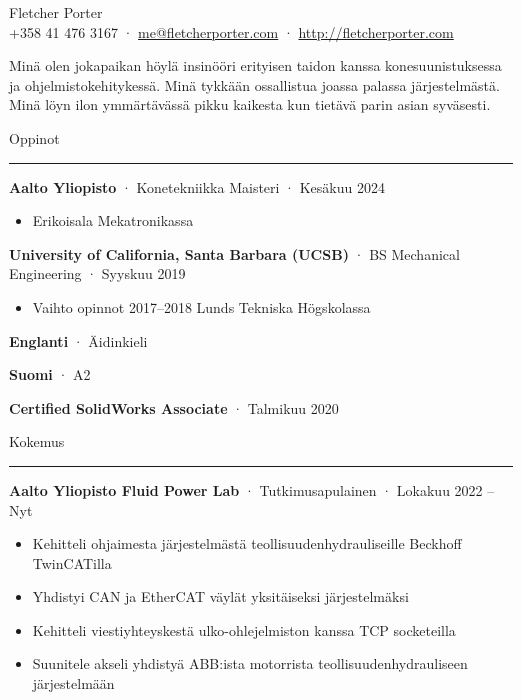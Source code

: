 \documentclass[12pt, oneside]{article}
\newcommand{\titlestyle}[1] {
	{\fontsize{40pt}{1em}\selectfont \textcolor{new_red}{\textsf{#1}}} \\
}
\newcommand{\headingstyleJobs}[1] {
	{\fontsize{18pt}{1em}\selectfont \textcolor{new_red}{\textsf{#1}}}
	\textcolor{new_red}{\rule{3.25in}{0.5pt}} \vspace{3pt}
}
\newcommand{\infostyle}[1] {
	{\selectfont #1} \\ %
}
\newcommand{\jobtitle}[3] {
	{\bf #1} · {#2} · {#3} \vspace{-7pt} \\
}
\newcommand{\certification}[2] {
	{\bf #1} · {#2}
}
\renewenvironment{quote}{%
  \list{}{%
    \leftmargin4pt
    \rightmargin\leftmargin
  }
  \item\relax
}
{\endlist}
\newcommand{\overview}[1] {
	\begin{quote}
		#1
	\end{quote}
}
\begin{document}
\begin{flushleft}



\titlestyle{Fletcher Porter}
\infostyle{+358 41 476 3167 · \href{mailto:me@fletcherporter.com}{me@fletcherporter.com} · \url{http://fletcherporter.com}}

\overview{
Minä olen jokapaikan höylä insinööri erityisen taidon kanssa konesuunistuksessa ja ohjelmistokehitykessä.  Minä tykkään ossallistua joassa palassa järjestelmästä.  Minä löyn ilon ymmärtävässä pikku kaikesta kun tietävä parin asian syväsesti.
}

\headingstyleJobs{Oppinot}

\jobtitle{Aalto Yliopisto}{Konetekniikka Maisteri}{Kesäkuu 2024}
\begin{itemize}
    \item Erikoisala Mekatronikassa
\end{itemize}

\jobtitle{University of California, Santa Barbara (UCSB)}{BS Mechanical Engineering}{Syyskuu 2019}
\begin{itemize}
	\item Vaihto opinnot 2017–2018 Lunds Tekniska Högskolassa \\
\end{itemize}


\certification{Englanti}{Äidinkieli} \certification{Suomi}{A2} \vspace{5pt}

\certification{Certified SolidWorks Associate}{Talmikuu 2020} \vspace{5pt}


\headingstyleJobs{Kokemus}

\jobtitle{Aalto Yliopisto Fluid Power Lab}{Tutkimusapulainen}{Lokakuu 2022 – Nyt}
\begin{itemize}
	\item Kehitteli ohjaimesta järjestelmästä teollisuudenhydrauliseille Beckhoff TwinCATilla \\
	\item Yhdistyi CAN ja EtherCAT väylät yksitäiseksi järjestelmäksi \\
	\item Kehitteli viestiyhteyskestä ulko-ohlejelmiston kanssa TCP socketeilla \\
	\item Suunitele akseli yhdistyä ABB:ista motorrista teollisuudenhydrauliseen järjestelmään
\end{itemize}


\end{flushleft}
\end{document}
